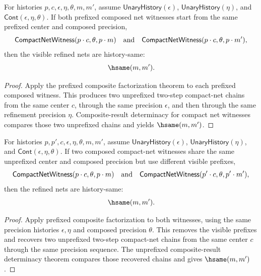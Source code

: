 
\begin{theorem}
\label{thm:compact-net-witness-prefixed-composite-result-deterministic}
For histories $p,c,\epsilon,\eta,\theta,m,m'$, assume
$\mathsf{UnaryHistory}(\epsilon)$, $\mathsf{UnaryHistory}(\eta)$, and
$\mathsf{Cont}(\epsilon,\eta,\theta)$. If both prefixed composed net witnesses
start from the same prefixed center and composed precision,
$$
\mathsf{CompactNetWitness}(p \cdot c,\theta,p \cdot m)
\quad\hbox{and}\quad
\mathsf{CompactNetWitness}(p \cdot c,\theta,p \cdot m'),
$$
then the visible refined nets are history-same:
$$
\hsame(m,m').
$$
\end{theorem}
\begin{proof}
Apply the prefixed composite factorization theorem to each prefixed composed
witness. This produces two unprefixed two-step compact-net chains from the same
center $c$, through the same precision $\epsilon$, and then through the same
refinement precision $\eta$. Composite-result determinacy for compact net
witnesses compares those two unprefixed chains and yields $\hsame(m,m')$.
\end{proof}

\begin{theorem}
\label{thm:compact-net-witness-prefixed-composite-prefix-independent-result-deterministic}
For histories $p,p',c,\epsilon,\eta,\theta,m,m'$, assume
$\mathsf{UnaryHistory}(\epsilon)$, $\mathsf{UnaryHistory}(\eta)$, and
$\mathsf{Cont}(\epsilon,\eta,\theta)$. If two composed compact-net witnesses
share the same unprefixed center and composed precision but use different
visible prefixes,
$$
\mathsf{CompactNetWitness}(p \cdot c,\theta,p \cdot m)
\quad\hbox{and}\quad
\mathsf{CompactNetWitness}(p' \cdot c,\theta,p' \cdot m'),
$$
then the refined nets are history-same:
$$
\hsame(m,m').
$$
\end{theorem}
\begin{proof}
Apply prefixed composite factorization to both witnesses, using the same
precision histories $\epsilon,\eta$ and composed precision $\theta$. This
removes the visible prefixes and recovers two unprefixed two-step compact-net
chains from the same center $c$ through the same precision sequence. The
unprefixed composite-result determinacy theorem compares those recovered chains
and gives $\hsame(m,m')$.
\end{proof}

